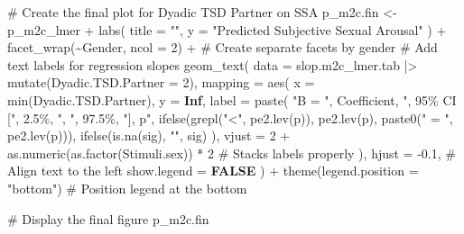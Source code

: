 \documentclass[
  bookmarksnumbered]{article}
\newenvironment{Shaded}{\begin{snugshade}}{\end{snugshade}}
\newcommand{\AttributeTok}[1]{\textcolor[rgb]{0.80,0.80,0.80}{#1}}
\newcommand{\CommentTok}[1]{\textcolor[rgb]{0.50,0.62,0.50}{#1}}
\newcommand{\ConstantTok}[1]{\textcolor[rgb]{0.86,0.64,0.64}{\textbf{#1}}}
\newcommand{\DecValTok}[1]{\textcolor[rgb]{0.86,0.86,0.80}{#1}}
\newcommand{\FloatTok}[1]{\textcolor[rgb]{0.75,0.75,0.82}{#1}}
\newcommand{\FunctionTok}[1]{\textcolor[rgb]{0.94,0.94,0.56}{#1}}
\newcommand{\NormalTok}[1]{\textcolor[rgb]{0.80,0.80,0.80}{#1}}
\newcommand{\OtherTok}[1]{\textcolor[rgb]{0.94,0.94,0.56}{#1}}
\newcommand{\SpecialCharTok}[1]{\textcolor[rgb]{0.86,0.64,0.64}{#1}}
\newcommand{\StringTok}[1]{\textcolor[rgb]{0.80,0.58,0.58}{#1}}
\begin{document}
\begin{Shaded}
\begin{Highlighting}[]
\CommentTok{\# Create the final plot for Dyadic TSD Partner on SSA}
\NormalTok{p\_m2c.fin }\OtherTok{\textless{}{-}}\NormalTok{ p\_m2c\_lmer }\SpecialCharTok{+}
  \FunctionTok{labs}\NormalTok{(}
    \AttributeTok{title =} \StringTok{""}\NormalTok{,}
    \AttributeTok{y =} \StringTok{"Predicted Subjective Sexual Arousal"}
\NormalTok{  ) }\SpecialCharTok{+}
  \FunctionTok{facet\_wrap}\NormalTok{(}\SpecialCharTok{\textasciitilde{}}\NormalTok{Gender, }\AttributeTok{ncol =} \DecValTok{2}\NormalTok{) }\SpecialCharTok{+} \CommentTok{\# Create separate facets by gender}
  \CommentTok{\# Add text labels for regression slopes}
  \FunctionTok{geom\_text}\NormalTok{(}
    \AttributeTok{data =}\NormalTok{ slop.m2c\_lmer.tab }\SpecialCharTok{|\textgreater{}} \FunctionTok{mutate}\NormalTok{(}\AttributeTok{Dyadic.TSD.Partner =} \DecValTok{2}\NormalTok{),}
    \AttributeTok{mapping =} \FunctionTok{aes}\NormalTok{(}
      \AttributeTok{x =} \FunctionTok{min}\NormalTok{(Dyadic.TSD.Partner), }\AttributeTok{y =} \ConstantTok{Inf}\NormalTok{,}
      \AttributeTok{label =} \FunctionTok{paste}\NormalTok{(}
        \StringTok{"B = "}\NormalTok{, Coefficient,}
        \StringTok{", 95\% CI ["}\NormalTok{, }\StringTok{\textasciigrave{}}\AttributeTok{2.5\%}\StringTok{\textasciigrave{}}\NormalTok{, }\StringTok{", "}\NormalTok{, }\StringTok{\textasciigrave{}}\AttributeTok{97.5\%}\StringTok{\textasciigrave{}}\NormalTok{,}
        \StringTok{"], p"}\NormalTok{, }\FunctionTok{ifelse}\NormalTok{(}\FunctionTok{grepl}\NormalTok{(}\StringTok{"\textless{}"}\NormalTok{, }\FunctionTok{pe2.lev}\NormalTok{(p)), }\FunctionTok{pe2.lev}\NormalTok{(p), }\FunctionTok{paste0}\NormalTok{(}\StringTok{" = "}\NormalTok{, }\FunctionTok{pe2.lev}\NormalTok{(p))),}
        \FunctionTok{ifelse}\NormalTok{(}\FunctionTok{is.na}\NormalTok{(sig), }\StringTok{""}\NormalTok{, sig)}
\NormalTok{      ),}
      \AttributeTok{vjust =} \DecValTok{2} \SpecialCharTok{+} \FunctionTok{as.numeric}\NormalTok{(}\FunctionTok{as.factor}\NormalTok{(Stimuli.sex)) }\SpecialCharTok{*} \DecValTok{2} \CommentTok{\# Stacks labels properly}
\NormalTok{    ),}
    \AttributeTok{hjust =} \SpecialCharTok{{-}}\FloatTok{0.1}\NormalTok{, }\CommentTok{\# Align text to the left}
    \AttributeTok{show.legend =} \ConstantTok{FALSE}
\NormalTok{  ) }\SpecialCharTok{+}
  \FunctionTok{theme}\NormalTok{(}\AttributeTok{legend.position =} \StringTok{"bottom"}\NormalTok{) }\CommentTok{\# Position legend at the bottom}

\CommentTok{\# Display the final figure}
\NormalTok{p\_m2c.fin}
\end{Highlighting}
\end{Shaded}
\end{document}
